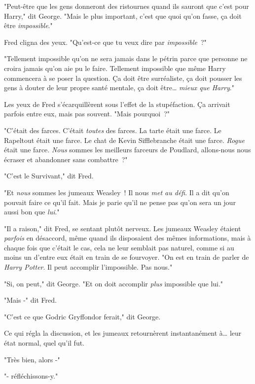 "Peut-être que les gens donneront des ristournes quand ils sauront que c'est pour Harry," dit George. "Mais le plus important, c'est que quoi qu'on fasse, ça doit être \emph{impossible}."

Fred cligna des yeux. "Qu'est-ce que tu veux dire par \emph{impossible}~?"

"Tellement impossible qu'on ne sera jamais dans le pétrin parce que personne ne croira jamais qu'on aie pu le faire. Tellement impossible que même Harry commencera à se poser la question. Ça doit être surréaliste, ça doit pousser les gens à douter de leur propre santé mentale, ça doit être… \emph{mieux que Harry}."

Les yeux de Fred s'écarquillèrent sous l'effet de la stupéfaction. Ça arrivait parfois entre eux, mais pas souvent. "Mais pourquoi~?"

"C'était des farces. C'était \emph{toutes} des farces. La tarte était une farce. Le Rapeltout était une farce. Le chat de Kevin Sifflebranche était une farce. \emph{Rogue} était une farce. \emph{Nous} sommes les meilleurs farceurs de Poudlard, allons-nous nous écraser et abandonner sans combattre~?"

"C'est le Survivant," dit Fred.

"Et \emph{nous} sommes les jumeaux Weasley~! Il nous \emph{met au défi}. Il a dit qu'on pouvait faire ce qu'il fait. Mais je parie qu'il ne pense pas qu'on sera un jour aussi bon que \emph{lui}."

"Il a raison," dit Fred, se sentant plutôt nerveux. Les jumeaux Weasley étaient \emph{parfois} en désaccord, même quand ils disposaient des mêmes informations, mais à chaque fois que c'était le cas, cela ne leur semblait pas naturel, comme si au moins un d'entre eux était en train de se fourvoyer. "On est en train de parler de \emph{Harry Potter}. Il peut accomplir l'impossible. Pas nous."

"Si, on peut," dit George. "Et on doit accomplir \emph{plus} impossible que lui."

"Mais -" dit Fred.

"C'est ce que Godric Gryffondor ferait," dit George.

Ce qui régla la discussion, et les jumeaux retournèrent instantanément à… leur état normal, quel qu'il fut.

"Très bien, alors -"

"- réfléchissons-y."~ 

